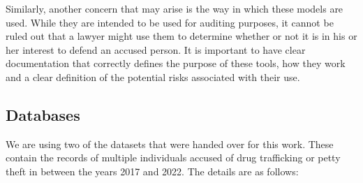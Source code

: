 \documentclass[twoside,11pt]{article}
\begin{document}
Similarly, another concern that may arise is the way in which these models are used. While they are intended to be used for auditing purposes, it cannot be ruled out that a lawyer might use them to determine whether or not it is in his or her interest to defend an accused person. It is important to have clear documentation that correctly defines the purpose of these tools, how they work and a clear definition of the potential risks associated with their use.

\subsection{Databases}\label{subsec:Databases}

We are using two of the datasets that were handed over for this work. These contain the records of multiple individuals accused of drug trafficking or petty theft in between the years 2017 and 2022. The details are as follows:
\end{document}
